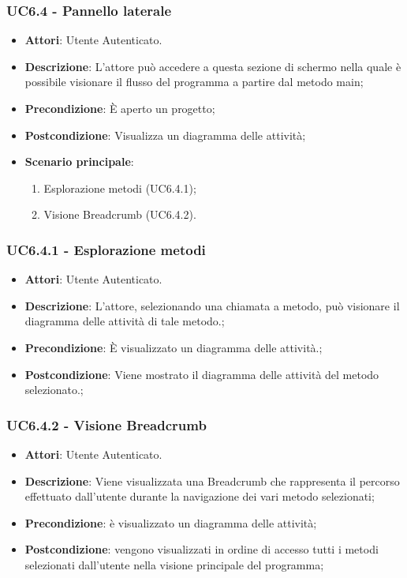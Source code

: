\subsubsection{UC6.4 - Pannello laterale} 
\label{sssec:UC6.4} 
\begin{itemize} 
\item \textbf{Attori}: Utente Autenticato.
\item \textbf{Descrizione}: L'attore può accedere a questa sezione di schermo nella quale è possibile visionare il flusso del programma a partire dal metodo main;
\item \textbf{Precondizione}: È aperto un progetto;
\item \textbf{Postcondizione}: Visualizza un diagramma delle attività;
\item \textbf{Scenario principale}: \begin{enumerate}\item Esplorazione metodi (UC6.4.1);\item Visione Breadcrumb (UC6.4.2). 
 \end{enumerate}
\end{itemize} 
\subsubsection{UC6.4.1 - Esplorazione metodi} 
\label{sssec:UC6.4.1} 
\begin{itemize} 
\item \textbf{Attori}: Utente Autenticato.
\item \textbf{Descrizione}: L'attore, selezionando una chiamata a metodo, può visionare il diagramma delle attività di tale metodo.;
\item \textbf{Precondizione}: È visualizzato un diagramma delle attività.;
\item \textbf{Postcondizione}: Viene mostrato il diagramma delle attività del metodo selezionato.;
\end{itemize} 
\subsubsection{UC6.4.2 - Visione Breadcrumb} 
\label{sssec:UC6.4.2} 
\begin{itemize} 
\item \textbf{Attori}: Utente Autenticato.
\item \textbf{Descrizione}: Viene visualizzata una Breadcrumb che rappresenta il percorso effettuato dall'utente durante la navigazione dei vari metodo selezionati;
\item \textbf{Precondizione}: è visualizzato un diagramma delle attività;
\item \textbf{Postcondizione}: vengono visualizzati in ordine di accesso tutti i metodi selezionati dall'utente nella visione principale del programma;
\end{itemize} 
